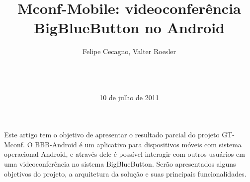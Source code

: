 \documentclass{acm_proc_article-sp}
\begin{document}
\title{Mconf-Mobile: videoconferência \\BigBlueButton no Android}
%
%
%
%
%

%
\author{
%
%
Felipe Cecagno,
Valter Roesler\\
       \\
       \\
       \\
}
\date{10 de julho de 2011}

\maketitle
\begin{resumo}
  Este artigo tem o objetivo de apresentar o resultado parcial do projeto GT-Mconf. O BBB-Android é um aplicativo para dispositivos móveis com sistema operacional Android, e através dele é possível interagir com outros usuários em uma videoconferência no sistema BigBlueButton. Serão apresentados alguns objetivos do projeto, a arquitetura da solução e suas principais funcionalidades.
\end{resumo}
\end{document}
